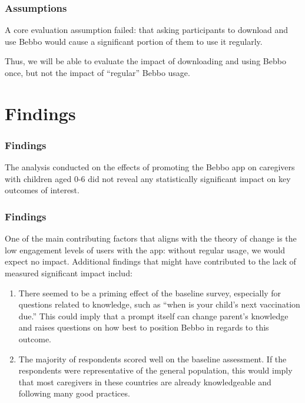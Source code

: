 \documentclass[aspectratio=169]{beamer}
\begin{document}
\begin{frame}
  \frametitle{Assumptions}

  A core evaluation assumption failed: that asking participants to download and use Bebbo would cause a significant portion of them to use it regularly.

Thus, we will be able to evaluate the impact of downloading and using Bebbo once, but not the impact of ``regular'' Bebbo usage.

\end{frame}

\section{Findings}

\begin{frame}
\frametitle{Findings}
 
The analysis conducted on the effects of promoting the Bebbo app on caregivers with children aged 0-6 did not reveal any statistically significant impact on key outcomes of interest. 

\end{frame}


\begin{frame}
   \frametitle{Findings}
One of the main contributing factors that aligns with the theory of change is the low engagement levels of users with the app: without regular usage, we would expect no impact. Additional findings that might have contributed to the lack of measured significant impact includ: 

  \begin{enumerate}
  \item There seemed to be a priming effect of the baseline survey, especially for questions related to knowledge, such as “when is your child’s next vaccination due.” This could imply that a prompt itself can change parent’s knowledge and raises questions on how best to position Bebbo in regards to this outcome. 
  \item The majority of respondents scored well on the baseline assessment. If the respondents were representative of the general population, this would imply that most caregivers in these countries are already knowledgeable and following many good practices.
  \end{enumerate}
    
\end{frame}
\end{document}
